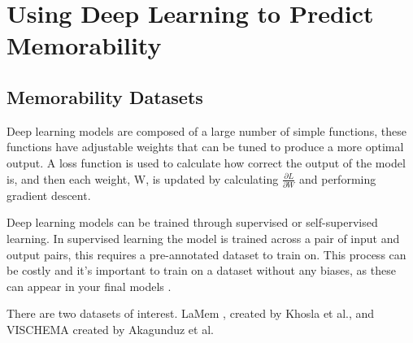 \documentclass{UoYCSproject}
\begin{document}
\section{Using Deep Learning to Predict Memorability}


\subsection{Memorability Datasets}


Deep learning models are composed of a large number of simple functions, these functions have adjustable weights that can be tuned to produce a more optimal output. A loss function is used to calculate how correct the output of the model is, and then each weight, W, is updated by calculating $\frac{\partial L}{\partial W}$ and performing gradient descent.

Deep learning models can be trained through supervised or self-supervised learning. In supervised learning the model is trained across a pair of input and output pairs, this requires a pre-annotated dataset to train on. This process can be costly and it's important to train on a dataset without any biases, as these can appear in your final models \cite{dastin_2018, najibi_2020}.  

There are two datasets of interest. LaMem \cite{ICCV15_Khosla}, created by Khosla et al., and VISCHEMA \cite{VischemaPaper} created by Akagunduz et al. 
\end{document}
